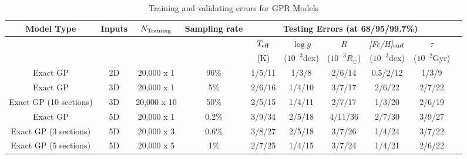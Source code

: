\begin{table}
	\centering
	\caption{Training and validating errors for GPR Models}
	\label{tab:results}
	\begin{tabular}{cccccccccc}
		\hline
		Model Type&Inputs&$N_{\rm Training}$ &Sampling rate &\multicolumn{5}{c}{Testing Errors (at 68/95/99.7\%)} \\
		 \hline
		 \multicolumn{4}{c}{}& $T_{\rm eff}$ &$\log g$  &$R$  &{\it [Fe/H]}$_{\rm surf}$   &$\tau$ \\
		 \multicolumn{4}{c}{}&  (K)& ($10^{-3}$dex) & ($10^{-3}R_{\odot}$)  &  ($10^{-3}$dex)  & ($10^{-2}$Gyr) \\		 
		 \hline
		 Exact GP & 2D & 20,000 x 1 &96\% & 1/5/11 & 1/3/8 & 2/6/14 & 0.5/2/12 &  1/3/9 \\
		 \hline		 
		 Exact GP & 3D & 20,000 x 1 & 5\% & 2/6/16 & 1/4/10 & 3/7/17 &  2/6/22 & 2/7/22 \\
		  Exact GP (10 sections) & 3D & 20,000 x 10 & 50\% & 2/5/15 &1/4/11 & 2/7/17& 1/3/20& 2/6/19\\
		  \hline		 
		 Exact GP & 5D & 20,000 x 1 & 0.2\% & 3/9/34 & 2/5/18 & 4/11/36 & 2/7/30 & 3/9/27  \\
		 Exact GP (3 sections) & 5D& 20,000 x 3 & 0.6\% &  3/8/27 & 2/5/18 & 3/7/26 & 1/4/24 &3/7/22 \\
		 Exact GP (5 sections) & 5D& 20,000 x 5 & 1\% &  2/7/25 & 1/4/15 & 3/7/24 & 1/4/21 &2/6/22 \\

\end{tabular}
\end{table}
